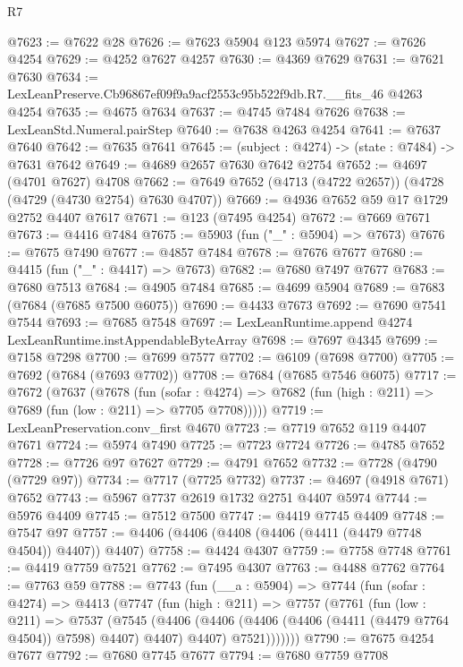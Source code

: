 \begin{lexlean}{R7}
\begin{coremodule}
@7623 := @7622 @28
@7626 := @7623 @5904 @123 @5974
@7627 := @7626 @4254
@7629 := @4252 @7627 @4257
@7630 := @4369 @7629
@7631 := @7621 @7630
@7634 := LexLeanPreserve.Cb96867ef09f9a9acf2553c95b522f9db.R7.__fits_46 @4263 @4254
@7635 := @4675 @7634
@7637 := @4745 @7484 @7626
@7638 := LexLeanStd.Numeral.pairStep
@7640 := @7638 @4263 @4254
@7641 := @7637 @7640
@7642 := @7635 @7641
@7645 := (subject : @4274) -> (state : @7484) -> @7631 @7642
@7649 := @4689 @2657 @7630 @7642 @2754
@7652 := @4697 (@4701 @7627) @4708
@7662 := @7649 @7652 (@4713 (@4722 @2657)) (@4728 (@4729 (@4730 @2754) @7630 @4707))
@7669 := @4936 @7652 @59 @17 @1729 @2752 @4407 @7617
@7671 := @123 (@7495 @4254)
@7672 := @7669 @7671
@7673 := @4416 @7484
@7675 := @5903 (fun ("_" : @5904) => @7673)
@7676 := @7675 @7490
@7677 := @4857 @7484
@7678 := @7676 @7677
@7680 := @4415 (fun ("_" : @4417) => @7673)
@7682 := @7680 @7497 @7677
@7683 := @7680 @7513
@7684 := @4905 @7484
@7685 := @4699 @5904
@7689 := @7683 (@7684 (@7685 @7500 @6075))
@7690 := @4433 @7673
@7692 := @7690 @7541 @7544
@7693 := @7685 @7548
@7697 := LexLeanRuntime.append @4274 LexLeanRuntime.instAppendableByteArray
@7698 := @7697 @4345
@7699 := @7158 @7298
@7700 := @7699 @7577
@7702 := @6109 (@7698 @7700)
@7705 := @7692 (@7684 (@7693 @7702))
@7708 := @7684 (@7685 @7546 @6075)
@7717 := @7672
    (@7637
      (@7678
        (fun (sofar : @4274) =>
        @7682 (fun (high : @211) => @7689 (fun (low : @211) => @7705 @7708)))))
@7719 := LexLeanPreservation.conv_first @4670
@7723 := @7719 @7652 @119 @4407 @7671
@7724 := @5974 @7490
@7725 := @7723 @7724
@7726 := @4785 @7652
@7728 := @7726 @97 @7627
@7729 := @4791 @7652
@7732 := @7728 (@4790 (@7729 @97))
@7734 := @7717 (@7725 @7732)
@7737 := @4697 (@4918 @7671) @7652
@7743 := @5967 @7737 @2619 @1732 @2751 @4407 @5974
@7744 := @5976 @4409
@7745 := @7512 @7500
@7747 := @4419 @7745 @4409
@7748 := @7547 @97
@7757 := @4406 (@4406 (@4408 (@4406 (@4411 (@4479 @7748 @4504)) @4407)) @4407)
@7758 := @4424 @4307
@7759 := @7758 @7748
@7761 := @4419 @7759 @7521
@7762 := @7495 @4307
@7763 := @4488 @7762
@7764 := @7763 @59
@7788 := @7743
    (fun (__a : @5904) =>
    @7744
      (fun (sofar : @4274) =>
      @4413
        (@7747
          (fun (high : @211) =>
          @7757
            (@7761
              (fun (low : @211) =>
              @7537
                (@7545
                  (@4406
                    (@4406 (@4406 (@4406 (@4411 (@4479 @7764 @4504)) @7598) @4407) @4407)
                    @4407)
                  @7521)))))))
@7790 := @7675 @4254 @7677
@7792 := @7680 @7745 @7677
@7794 := @7680 @7759 @7708

\end{coremodule}
\end{lexlean}
